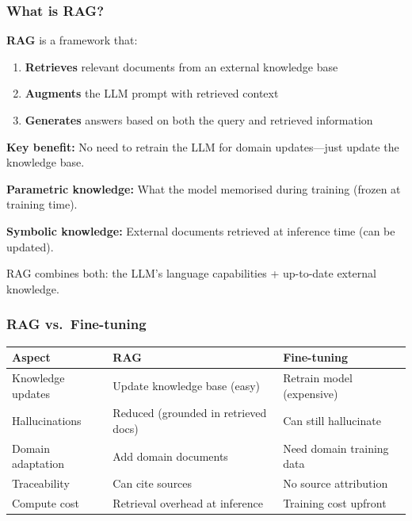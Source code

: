 \bigseparator

\subsubsection{What is RAG?}

\begin{defbox}
\textbf{RAG} is a framework that:
\begin{enumerate}
  \item \textbf{Retrieves} relevant documents from an external knowledge base
  \item \textbf{Augments} the LLM prompt with retrieved context
  \item \textbf{Generates} answers based on both the query and retrieved information
\end{enumerate}

\textbf{Key benefit:} No need to retrain the LLM for domain updates---just update the knowledge base.
\end{defbox}

\begin{tipbox}
\textbf{Parametric knowledge:} What the model memorised during training (frozen at training time).

\textbf{Symbolic knowledge:} External documents retrieved at inference time (can be updated).

RAG combines both: the LLM's language capabilities + up-to-date external knowledge.
\end{tipbox}

\bigseparator

\subsubsection{RAG vs.\ Fine-tuning}

\begin{center}
\renewcommand{\arraystretch}{1.3}
\begin{tabular}{@{} l p{5cm} p{5cm} @{}}
\toprule
\textbf{Aspect} & \textbf{RAG} & \textbf{Fine-tuning} \\
\midrule
Knowledge updates & Update knowledge base (easy) & Retrain model (expensive) \\
Hallucinations & Reduced (grounded in retrieved docs) & Can still hallucinate \\
Domain adaptation & Add domain documents & Need domain training data \\
Traceability & Can cite sources & No source attribution \\
Compute cost & Retrieval overhead at inference & Training cost upfront \\
\bottomrule
\end{tabular}
\end{center}

